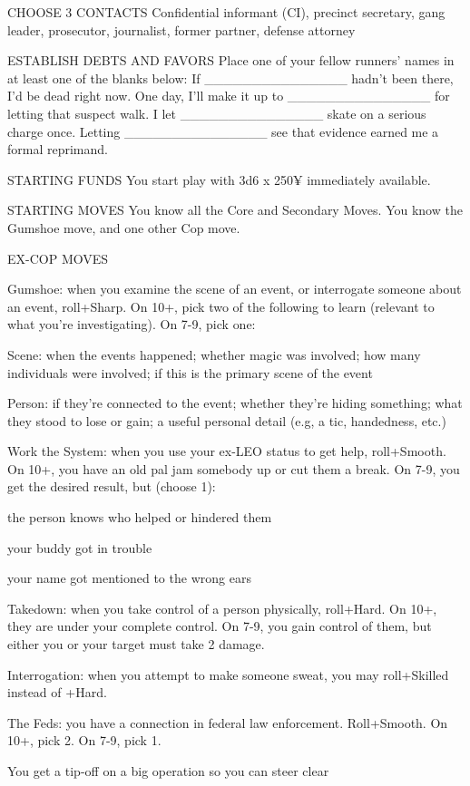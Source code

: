CHOOSE 3 CONTACTS
Confidential informant (CI), precinct secretary, gang leader, prosecutor, journalist, former partner, defense attorney

ESTABLISH DEBTS AND FAVORS
Place one of your fellow runners’ names in at least one of the blanks below:
If \_\_\_\_\_\_\_\_\_\_\_\_\_\_\_ hadn’t been there, I’d be dead right now.
One day, I’ll make it up to \_\_\_\_\_\_\_\_\_\_\_\_\_\_\_ for letting that suspect walk.
I let \_\_\_\_\_\_\_\_\_\_\_\_\_\_\_ skate on a serious charge once.
Letting \_\_\_\_\_\_\_\_\_\_\_\_\_\_\_ see that evidence earned me a formal reprimand.

STARTING FUNDS
You start play with 3d6 x 250¥ immediately available.

STARTING MOVES
You know all the Core and Secondary Moves.
You know the Gumshoe move, and one other Cop move.

EX-COP MOVES

Gumshoe: when you examine the scene of an event, or interrogate someone about an event, roll+Sharp. On 10+, pick two of the following to learn (relevant to what you’re investigating). On 7-9, pick one:

Scene: when the events happened; whether magic was involved; how many individuals were involved; if this is the primary scene of the event

Person: if they’re connected to the event; whether they’re hiding something; what they stood to lose or gain; a useful personal detail (e.g, a tic, handedness, etc.)

Work the System: when you use your ex-LEO status to get help, roll+Smooth. On 10+, you have an old pal jam somebody up or cut them a break. On 7-9, you get the desired result, but (choose 1):

the person knows who helped or hindered them

your buddy got in trouble

your name got mentioned to the wrong ears

Takedown: when you take control of a person physically, roll+Hard. On 10+, they are under your complete control. On 7-9, you gain control of them, but either you or your target must take 2 damage.

Interrogation: when you attempt to make someone sweat, you may roll+Skilled instead of +Hard.

The Feds: you have a connection in federal law enforcement. Roll+Smooth. On 10+, pick 2. On 7-9, pick 1.

You get a tip-off on a big operation so you can steer clear

